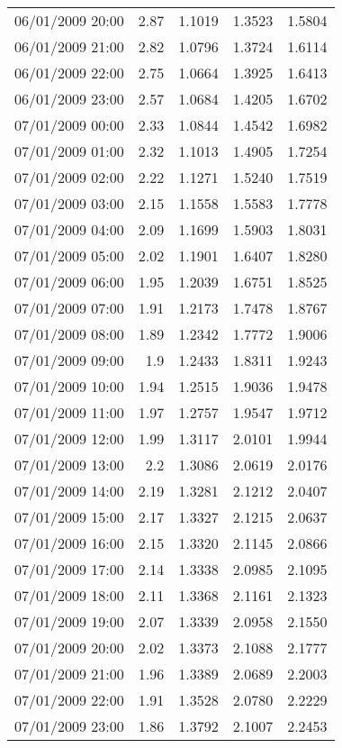 \begin{longtable}{|l|r|r|r|r|}
06/01/2009 20:00 & 2.87 & 1.1019 & 1.3523 & 1.5804 \\
06/01/2009 21:00 & 2.82 & 1.0796 & 1.3724 & 1.6114 \\
06/01/2009 22:00 & 2.75 & 1.0664 & 1.3925 & 1.6413 \\
06/01/2009 23:00 & 2.57 & 1.0684 & 1.4205 & 1.6702 \\
07/01/2009 00:00 & 2.33 & 1.0844 & 1.4542 & 1.6982 \\
07/01/2009 01:00 & 2.32 & 1.1013 & 1.4905 & 1.7254 \\
07/01/2009 02:00 & 2.22 & 1.1271 & 1.5240 & 1.7519 \\
07/01/2009 03:00 & 2.15 & 1.1558 & 1.5583 & 1.7778 \\
07/01/2009 04:00 & 2.09 & 1.1699 & 1.5903 & 1.8031 \\
07/01/2009 05:00 & 2.02 & 1.1901 & 1.6407 & 1.8280 \\
07/01/2009 06:00 & 1.95 & 1.2039 & 1.6751 & 1.8525 \\
07/01/2009 07:00 & 1.91 & 1.2173 & 1.7478 & 1.8767 \\
07/01/2009 08:00 & 1.89 & 1.2342 & 1.7772 & 1.9006 \\
07/01/2009 09:00 & 1.9 & 1.2433 & 1.8311 & 1.9243 \\
07/01/2009 10:00 & 1.94 & 1.2515 & 1.9036 & 1.9478 \\
07/01/2009 11:00 & 1.97 & 1.2757 & 1.9547 & 1.9712 \\
07/01/2009 12:00 & 1.99 & 1.3117 & 2.0101 & 1.9944 \\
07/01/2009 13:00 & 2.2 & 1.3086 & 2.0619 & 2.0176 \\
07/01/2009 14:00 & 2.19 & 1.3281 & 2.1212 & 2.0407 \\
07/01/2009 15:00 & 2.17 & 1.3327 & 2.1215 & 2.0637 \\
07/01/2009 16:00 & 2.15 & 1.3320 & 2.1145 & 2.0866 \\
07/01/2009 17:00 & 2.14 & 1.3338 & 2.0985 & 2.1095 \\
07/01/2009 18:00 & 2.11 & 1.3368 & 2.1161 & 2.1323 \\
07/01/2009 19:00 & 2.07 & 1.3339 & 2.0958 & 2.1550 \\
07/01/2009 20:00 & 2.02 & 1.3373 & 2.1088 & 2.1777 \\
07/01/2009 21:00 & 1.96 & 1.3389 & 2.0689 & 2.2003 \\
07/01/2009 22:00 & 1.91 & 1.3528 & 2.0780 & 2.2229 \\
07/01/2009 23:00 & 1.86 & 1.3792 & 2.1007 & 2.2453 \\

\end{longtable}
